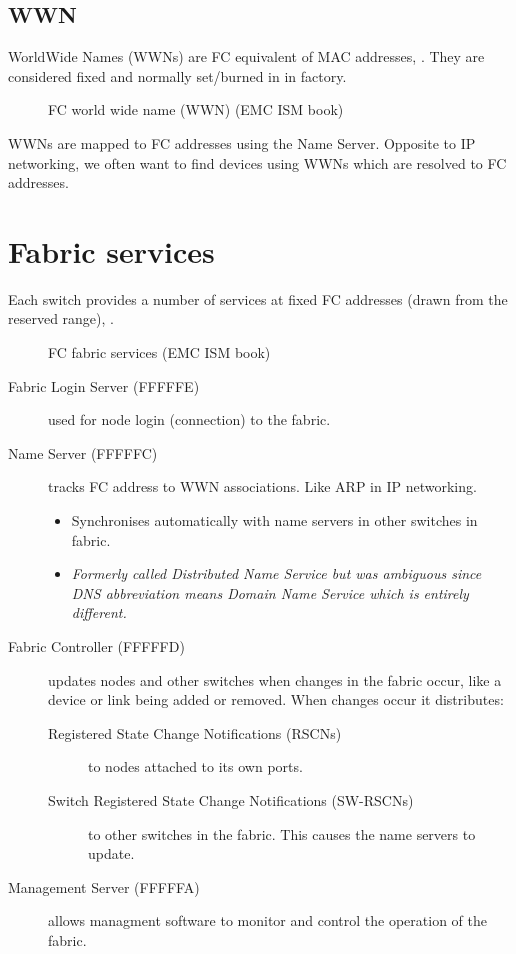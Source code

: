 \subsection{WWN}\label{wwn}

WorldWide Names (WWNs) are FC equivalent of MAC addresses, . They are
considered fixed and normally set/burned in in factory.

\begin{figure}
\centering
\caption{FC world wide name (WWN) (EMC ISM book){}}
\end{figure}

WWNs are mapped to FC addresses using the Name Server. Opposite to IP
networking, we often want to find devices using WWNs which are resolved
to FC addresses.

\section{Fabric services}\label{fabric-services}

Each switch provides a number of services at fixed FC addresses (drawn
from the reserved range), .

\begin{figure}
\centering
\caption{FC fabric services (EMC ISM book){}}
\end{figure}

\begin{description}
\item[Fabric Login Server (FFFFFE)]
used for node login (connection) to the fabric.
\item[Name Server (FFFFFC)]
tracks FC address to WWN associations. Like ARP in IP networking.

\begin{itemize}
\item
  Synchronises automatically with name servers in other switches in
  fabric.
\item
  \emph{Formerly called Distributed Name Service but was ambiguous since
  DNS abbreviation means Domain Name Service which is entirely
  different.}
\end{itemize}
\item[Fabric Controller (FFFFFD)]
updates nodes and other switches when changes in the fabric occur, like
a device or link being added or removed. When changes occur it
distributes:

\begin{description}
\item[Registered State Change Notifications (RSCNs)]
to nodes attached to its own ports.
\item[Switch Registered State Change Notifications (SW-RSCNs)]
to other switches in the fabric. This causes the name servers to update.
\end{description}
\item[Management Server (FFFFFA)]
allows managment software to monitor and control the operation of the
fabric.
\end{description}

